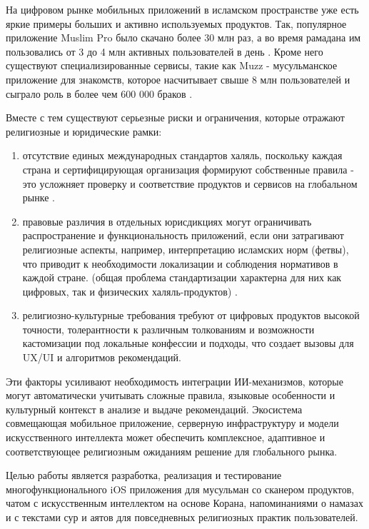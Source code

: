 На цифровом рынке мобильных приложений в исламском пространстве уже есть яркие примеры больших и активно используемых продуктов. Так, популярное приложение Muslim Pro\textit{ }было скачано более 30 млн раз, а во время рамадана им пользовались от 3 до 4 млн активных пользователей в день \cite{ref4}. Кроме него существуют специализированные сервисы, такие как Muzz - мусульманское приложение для знакомств, которое насчитывает свыше 8 млн пользователей и сыграло роль в более чем 600 000 браков \cite{ref5}.


Вместе с тем существуют серьезные риски и ограничения, которые отражают религиозные и юридические рамки:

\begin{enumerate}
	\item отсутствие единых международных стандартов халяль, поскольку каждая страна и сертифицирующая организация формируют собственные правила - это усложняет проверку и соответствие продуктов и сервисов на глобальном рынке \cite{ref7}.
	\item правовые различия в отдельных юрисдикциях могут ограничивать распространение и функциональность приложений, если они затрагивают религиозные аспекты, например, интерпретацию исламских норм (фетвы), что приводит к необходимости локализации и соблюдения нормативов в каждой стране. (общая проблема стандартизации характерна для них как цифровых, так и физических халяль-продуктов) \cite{ref7}.
	\item религиозно-культурные требования требуют от цифровых продуктов высокой точности, толерантности к различным толкованиям и возможности кастомизации под локальные конфессии и подходы, что создает вызовы для UX/UI и алгоритмов рекомендаций.
\end{enumerate}

Эти факторы усиливают необходимость интеграции ИИ-механизмов, которые могут автоматически учитывать сложные правила, языковые особенности и культурный контекст в анализе и выдаче рекомендаций. Экосистема совмещающая мобильное приложение, серверную инфраструктуру и модели искусственного интеллекта может обеспечить комплексное, адаптивное и соответствующее религиозным ожиданиям решение для глобального рынка.


Целью работы является разработка, реализация и тестирование многофункционального iOS приложения для мусульман со сканером продуктов, чатом с искусственным интеллектом на основе Корана, напоминаниями о намазах и с текстами сур и аятов для повседневных религиозных практик пользователей.


